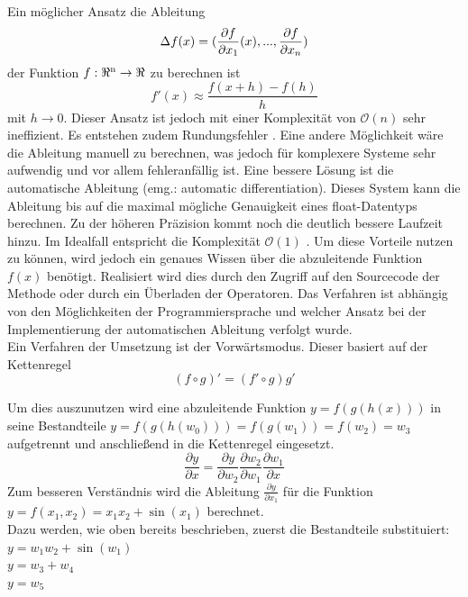 \documentclass{like}
\begin{document}
Ein möglicher Ansatz die Ableitung 
\begin{equation}
	\Delta{\tiny } f(x) = (\frac{\partial f}{\partial x_1} (x), ..., \frac{\partial f}{\partial x_n})
\end{equation}
der Funktion $f:\Re \textsuperscript{n} \rightarrow \Re $ zu berechnen ist \\
\begin{equation}
	f'(x) \approx \frac{f(x+h) - f(h)}{h}
\end{equation}
 mit $ h \rightarrow 0$.
Dieser Ansatz ist jedoch mit einer Komplexität von $\mathcal{O}(n)$ sehr ineffizient. Es entstehen zudem Rundungsfehler \cite{julDiff}.
Eine andere Möglichkeit wäre die Ableitung manuell zu berechnen, was jedoch für komplexere Systeme sehr aufwendig und vor allem fehleranfällig ist. Eine bessere Lösung ist die automatische Ableitung (emg.: automatic differentiation). 
Dieses System kann die Ableitung bis auf die maximal mögliche Genauigkeit eines float-Datentyps berechnen. Zu der höheren Präzision kommt noch die deutlich bessere Laufzeit hinzu. Im Idealfall entspricht die Komplexität $\mathcal{O}(1)$ \cite{julDiff}. Um diese Vorteile nutzen zu können, wird jedoch ein genaues Wissen über die abzuleitende Funktion \(f(x)\) benötigt. Realisiert wird dies durch den Zugriff auf den Sourcecode der Methode oder durch ein Überladen der Operatoren. Das Verfahren ist abhängig von den Möglichkeiten der Programmiersprache und welcher Ansatz bei der Implementierung der automatischen Ableitung verfolgt wurde. \\

Ein Verfahren der Umsetzung ist der Vorwärtsmodus. Dieser basiert auf der Kettenregel 
\begin{equation}
	(f \circ g)' = (f' \circ g)g'
\end{equation}

Um dies auszunutzen wird eine abzuleitende Funktion $ y = f(g(h(x)))$ in seine Bestandteile $y = f(g(h(w_0))) = f(g(w_1)) = f(w_2) = w_3$ aufgetrennt und anschließend in die Kettenregel eingesetzt. 
\begin{equation}
\frac{\partial y}{\partial x} = \frac{\partial y}{\partial w_2} \frac{\partial w_2}{\partial w_1} \frac{\partial w_1}{\partial x}
\end{equation}
Zum besseren Verständnis wird die Ableitung $\frac{\partial y}{\partial x_1}$ für die Funktion
$y = f(x_1, x_2) = x_1x_2 + \sin(x_1)$  berechnet.\\
Dazu werden, wie oben bereits beschrieben, zuerst die Bestandteile substituiert:\\
$y = w_1w_2 + \sin(w_1) $ \\
$y = w_3 + w_4$ \\
$y = w_5$
\end{document}

